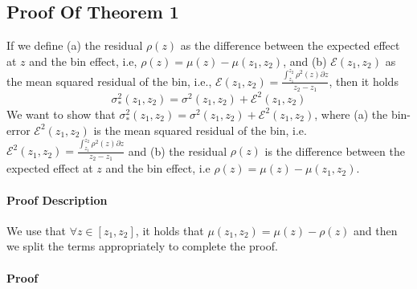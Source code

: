 \documentclass{article} %
\newenvironment{customthm}[1]
  {\renewcommand\theinnercustomthm{#1}\innercustomthm}
  {\endinnercustomthm}
\begin{document}
\subsection{Proof Of Theorem 1}
\label{sec:proof-3}

\begin{customthm}{3.1}
  \label{sec:theorem-1-app}
  If we define (a) the residual \(\rho(z)\) as the difference between
  the expected effect at \(z\) and the bin effect, i.e,
  \(\rho(z) = \mu(z) - \mu(z_1, z_2)\), and (b)
  \(\mathcal{E}(z_1, z_2)\) as the mean squared residual of the bin,
  i.e.,
  \(\mathcal{E}(z_1, z_2) = \frac{\int_{z_1}^{z_2}\rho^2(z) \partial
    z}{z_2 - z_1}\), then it holds
%
\begin{equation}
    \label{eq:bin-uncertainty-proof}
 \sigma_*^2(z_1, z_2) = \sigma^2(z_1, z_2) + \mathcal{E}^2(z_1, z_2)
\end{equation}
\end{customthm}
%
We want to show that
\(\sigma_*^2(z_1, z_2) = \sigma^2(z_1, z_2) + \mathcal{E}^2(z_1,
z_2)\), where (a) the bin-error \(\mathcal{E}^2(z_1, z_2)\) is the
mean squared residual of the bin, i.e.
\(\mathcal{E}^2(z_1, z_2) = \frac{\int_{z_1}^{z_2}\rho^2(z) \partial
  z}{z_2 - z_1}\) and (b) the residual \(\rho(z)\) is the difference
between the expected effect at \(z\) and the bin effect, i.e
\(\rho(z) = \mu(z) - \mu(z_1, z_2)\).

\paragraph{Proof Description}

We use that \(\forall z \in [z_1, z_2]\), it holds that \(\mu(z_1, z_2) = \mu(z) - \rho(z)\) and then we split the terms appropriately to complete the proof.

\paragraph{Proof}
\end{document}
